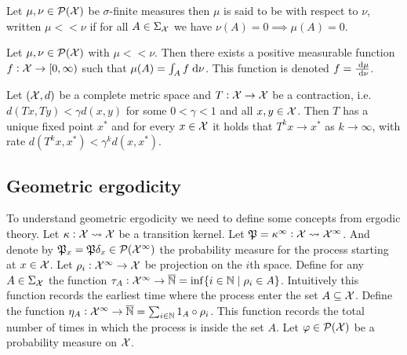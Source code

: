 \begin{defn}
  Let $\mu, \nu \in \mathcal{P}(\mathcal{X})$ be $\sigma$-finite measures
  then $\mu$ is said to be  with respect to 
  $\nu$, written $\mu << \nu$ if for all $A \in \Sigma_\mathcal{X}$ we have
  $\nu(A)=0 \implies \mu(A)=0$.
  \label{defn:absContMeas}
\end{defn}

\begin{thm}
  Let $\mu, \nu \in \mathcal{P}(\mathcal{X})$ with $\mu << \nu$.
  Then there exists a positive measurable function
  $f : \mathcal{X} \to [0, \infty)$
  such that $\mu(A) = \int_A f \; \mathrm{d} \nu$.
  This function is denoted $f = \frac{\; \mathrm{d} \mu}{\; \mathrm{d} \nu}$.
  \label{thm:radonNiko}
\end{thm}

\begin{thm}
  Let $(\mathcal{X}, d)$ be a complete metric space
  and $T:\mathcal{X} \to \mathcal{X}$ be a contraction,
  i.e. $d(Tx, Ty)<\gamma d(x, y)$ for some $0 < \gamma < 1$
  and all $x,y \in \mathcal{X}$.
  Then $T$ has a unique fixed point $x^*$ and for every $x\in \mathcal{X}$
  it holds that $T^k x \to x^*$ as $k \to \infty$, with rate
  $d(T^k x, x^*) < \gamma^k d(x, x^*)$.
  \label{thm:BanachFP}
\end{thm}

\subsection{Geometric ergodicity}
\label{sec:geometricErgo}

To understand geometric ergodicity we need
to define some concepts from ergodic theory.
Let $\kappa : \mathcal{X} \leadsto \mathcal{X}$ be a transition kernel.
Let $\mathfrak{P} = \kappa^\infty : \mathcal{X} \leadsto \mathcal{X}^\infty$.
And denote by
$\mathfrak{P}_x = \mathfrak{P}\delta_x \in \mathcal{P}(\mathcal{X}^\infty)$
the probability measure for the process starting at $x \in \mathcal{X}$.
Let $\rho_i : \mathcal{X}^\infty \to \mathcal{X}$ be projection on the
$i$th space.
Define for any $A \in \Sigma_{\mathcal{X}}$ the function
$\tau_A : \mathcal{X}^\infty \to \overline{\mathbb{N}} = \inf\{ i \in \mathbb{N} \mid \rho_i \in A \}$.
Intuitively this function records the earliest time where the process
enter the set $A \subseteq \mathcal{X}$.
Define the function
$\eta_A : \mathcal{X}^\infty \to \overline{\mathbb{N}} = \sum_{i \in \mathbb{N}} 1_A \circ \rho_i$.
This function records the total number of times in which the process is
inside the set $A$.
Let $\varphi \in \mathcal{P}(\mathcal{X})$ be a probability measure on $\mathcal{X}$.


